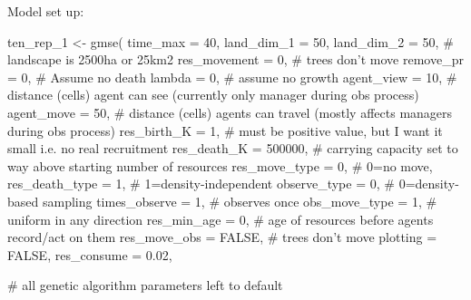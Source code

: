 \documentclass[
]{article}
\newenvironment{Shaded}{\begin{snugshade}}{\end{snugshade}}
\newcommand{\CommentTok}[1]{\textcolor[rgb]{0.50,0.62,0.50}{#1}}
\newcommand{\DataTypeTok}[1]{\textcolor[rgb]{0.87,0.87,0.75}{#1}}
\newcommand{\DecValTok}[1]{\textcolor[rgb]{0.86,0.86,0.80}{#1}}
\newcommand{\FloatTok}[1]{\textcolor[rgb]{0.75,0.75,0.82}{#1}}
\newcommand{\KeywordTok}[1]{\textcolor[rgb]{0.94,0.87,0.69}{#1}}
\newcommand{\NormalTok}[1]{\textcolor[rgb]{0.80,0.80,0.80}{#1}}
\newcommand{\OtherTok}[1]{\textcolor[rgb]{0.94,0.94,0.56}{#1}}
\newcommand{\StringTok}[1]{\textcolor[rgb]{0.80,0.58,0.58}{#1}}
\begin{document}
Model set up:

\begin{Shaded}
\begin{Highlighting}[]
\NormalTok{ten_rep_}\DecValTok{1}\NormalTok{ <-}\StringTok{ }\KeywordTok{gmse}\NormalTok{(}
  \DataTypeTok{time_max =} \DecValTok{40}\NormalTok{,}
  \DataTypeTok{land_dim_1 =} \DecValTok{50}\NormalTok{,}
  \DataTypeTok{land_dim_2 =} \DecValTok{50}\NormalTok{, }\CommentTok{# landscape is 2500ha or 25km2}
  \DataTypeTok{res_movement =} \DecValTok{0}\NormalTok{, }\CommentTok{# trees don't move }
  \DataTypeTok{remove_pr =} \DecValTok{0}\NormalTok{, }\CommentTok{# Assume no death }
  \DataTypeTok{lambda =} \DecValTok{0}\NormalTok{, }\CommentTok{# assume no growth}
  \DataTypeTok{agent_view =} \DecValTok{10}\NormalTok{, }\CommentTok{# distance (cells) agent can see (currently only manager during obs process)}
  \DataTypeTok{agent_move =} \DecValTok{50}\NormalTok{, }\CommentTok{# distance (cells) agents can travel (mostly affects managers during obs process)}
  \DataTypeTok{res_birth_K =} \DecValTok{1}\NormalTok{, }\CommentTok{# must be positive value, but I want it small i.e. no real recruitment}
  \DataTypeTok{res_death_K =} \DecValTok{500000}\NormalTok{, }\CommentTok{# carrying capacity set to way above starting number of resources}
  \DataTypeTok{res_move_type =} \DecValTok{0}\NormalTok{, }\CommentTok{# 0=no move, }
  \DataTypeTok{res_death_type =} \DecValTok{1}\NormalTok{, }\CommentTok{# 1=density-independent }
  \DataTypeTok{observe_type =} \DecValTok{0}\NormalTok{, }\CommentTok{# 0=density-based sampling }
  \DataTypeTok{times_observe =} \DecValTok{1}\NormalTok{, }\CommentTok{# observes once}
  \DataTypeTok{obs_move_type =} \DecValTok{1}\NormalTok{, }\CommentTok{# uniform in any direction}
  \DataTypeTok{res_min_age =} \DecValTok{0}\NormalTok{, }\CommentTok{# age of resources before agents record/act on them}
  \DataTypeTok{res_move_obs =} \OtherTok{FALSE}\NormalTok{, }\CommentTok{# trees don't move}
  \DataTypeTok{plotting =} \OtherTok{FALSE}\NormalTok{, }
  \DataTypeTok{res_consume =} \FloatTok{0.02}\NormalTok{,}
  
  \CommentTok{# all genetic algorithm parameters left to default}
  

\end{Highlighting}
\end{Shaded}
\end{document}
